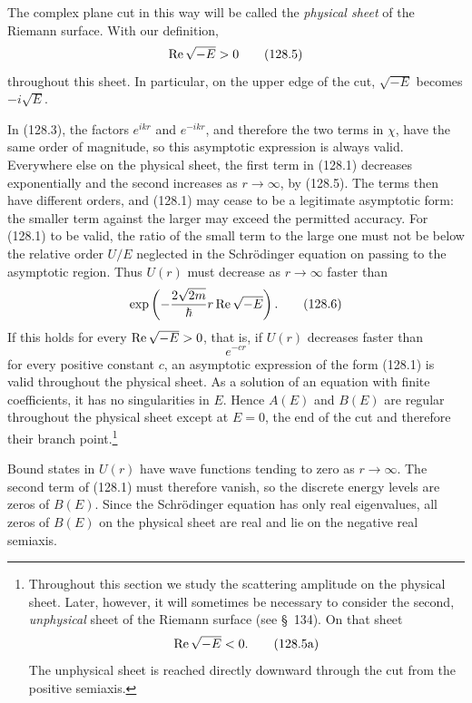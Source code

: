 The complex plane cut in this way will be called the \emph{physical sheet} of
the Riemann surface. With our definition,
\begin{equation}
 \mathop{\rm Re}\sqrt{-E}>0
 \tag{128.5}
\end{equation}
throughout this sheet. In particular, on the upper edge of the cut,
$\sqrt{-E}$ becomes $-i\sqrt E$.

In (128.3), the factors $e^{ikr}$ and $e^{-ikr}$, and therefore the two terms
in $\chi$, have the same order of magnitude, so this asymptotic expression is
always valid. Everywhere else on the physical sheet, the first term in (128.1)
decreases exponentially and the second increases as $r\to\infty$, by (128.5).
The terms then have different orders, and (128.1) may cease to be a legitimate
asymptotic form: the smaller term against the larger may exceed the permitted
accuracy. For (128.1) to be valid, the ratio of the small term to the large one
must not be below the relative order $U/E$ neglected in the Schrödinger
equation on passing to the asymptotic region. Thus $U(r)$ must decrease as
$r\to\infty$ faster than
\begin{equation}
 \exp\left(-\frac{2\sqrt{2m}}{\hbar}r\mathop{\rm Re}\sqrt{-E}\right).
 \tag{128.6}
\end{equation}
If this holds for every $\mathop{\rm Re}\sqrt{-E}>0$, that is, if $U(r)$
decreases faster than
\begin{equation}
 e^{-cr}
 \tag{128.6a}
\end{equation}
for every positive constant $c$, an asymptotic expression of the form (128.1)
is valid throughout the physical sheet. As a solution of an equation with
finite coefficients, it has no singularities in $E$. Hence $A(E)$ and $B(E)$
are regular throughout the physical sheet except at $E=0$, the end of the cut
and therefore their branch point.\footnote{Throughout this section we study
the scattering amplitude on the physical sheet. Later, however, it will
sometimes be necessary to consider the second, \emph{unphysical} sheet of the
Riemann surface (see \S~134). On that sheet
\begin{equation}
 \mathop{\rm Re}\sqrt{-E}<0.
 \tag{128.5a}
\end{equation}
The unphysical sheet is reached directly downward through the cut from the
positive semiaxis.}

Bound states in $U(r)$ have wave functions tending to zero as $r\to\infty$.
The second term of (128.1) must therefore vanish, so the discrete energy levels
are zeros of $B(E)$. Since the Schrödinger equation has only real eigenvalues,
all zeros of $B(E)$ on the physical sheet are real and lie on the negative real
semiaxis.

